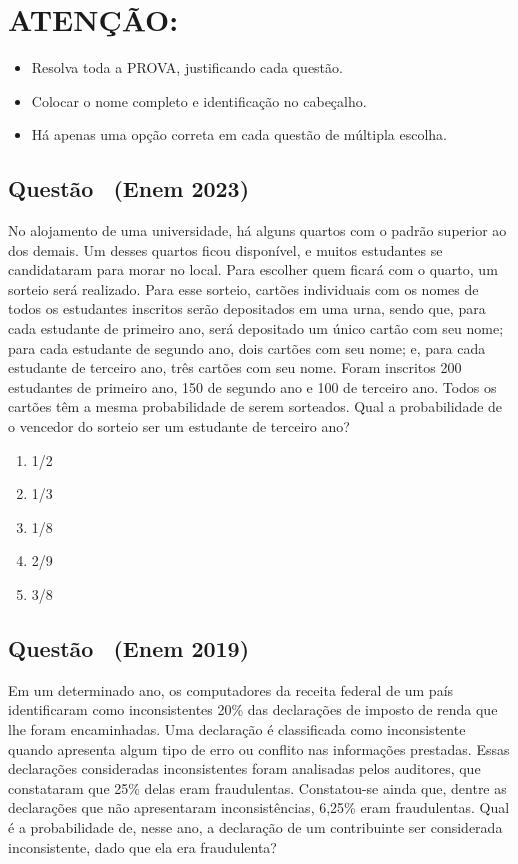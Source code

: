 \documentclass[12pt]{article}
\newcounter{questao}
\newcommand{\novaquestao}[1]{%
	\stepcounter{questao}%
	\subsection*{Questão \thequestao\ (#1)}%
}
\begin{document}
	\section*{\textbf{ATENÇÃO:}}
	\begin{itemize}[noitemsep]
		\item Resolva toda a PROVA, justificando cada questão.
		\item Colocar o nome completo e identificação no cabeçalho.
		\item Há apenas uma opção correta em cada questão de múltipla escolha.
	\end{itemize}
	\begin{multicols}{2}
		\columnseprule=0.4pt
		\columnsep=20pt
		
		\novaquestao{Enem 2023}
		
			No alojamento de uma universidade, há alguns quartos com o padrão superior ao dos demais. Um desses quartos ficou disponível, e muitos estudantes se candidataram para morar no local. Para escolher quem ficará com o quarto, um sorteio será realizado. Para esse sorteio, cartões individuais com os nomes de todos os estudantes inscritos serão depositados em uma urna, sendo que, para cada estudante de primeiro ano, será depositado um único cartão com seu nome; para cada estudante de segundo ano, dois cartões com seu nome; e, para cada estudante de terceiro ano, três cartões com seu nome. Foram inscritos 200 estudantes de primeiro ano, 150 de  segundo ano e 100 de terceiro ano. Todos os cartões têm a mesma probabilidade de serem sorteados. Qual a probabilidade de o vencedor do sorteio ser um estudante de terceiro ano?
		
			\begin{enumerate}[label=(\alph*), noitemsep]
				\item {1}/{2}
				\item {1}/{3}
				\item {1}/{8}
				\item {2}/{9}
				\item {3}/{8}
			\end{enumerate}
		
		\novaquestao{Enem 2019}
		
			Em um determinado ano, os computadores da receita federal de um país identificaram como inconsistentes 20\% das declarações de imposto de renda que lhe foram encaminhadas. Uma declaração é classificada como inconsistente quando apresenta algum tipo de erro ou conflito nas informações prestadas. Essas declarações 
			consideradas inconsistentes foram analisadas pelos auditores, que constataram que 25\% delas eram fraudulentas. Constatou-se ainda que, dentre as declarações que não apresentaram inconsistências, 6,25\% eram fraudulentas. Qual é a probabilidade de, nesse ano, a declaração de um contribuinte ser considerada inconsistente, dado 
			que ela era fraudulenta?
		

\end{multicols}
\end{document}
